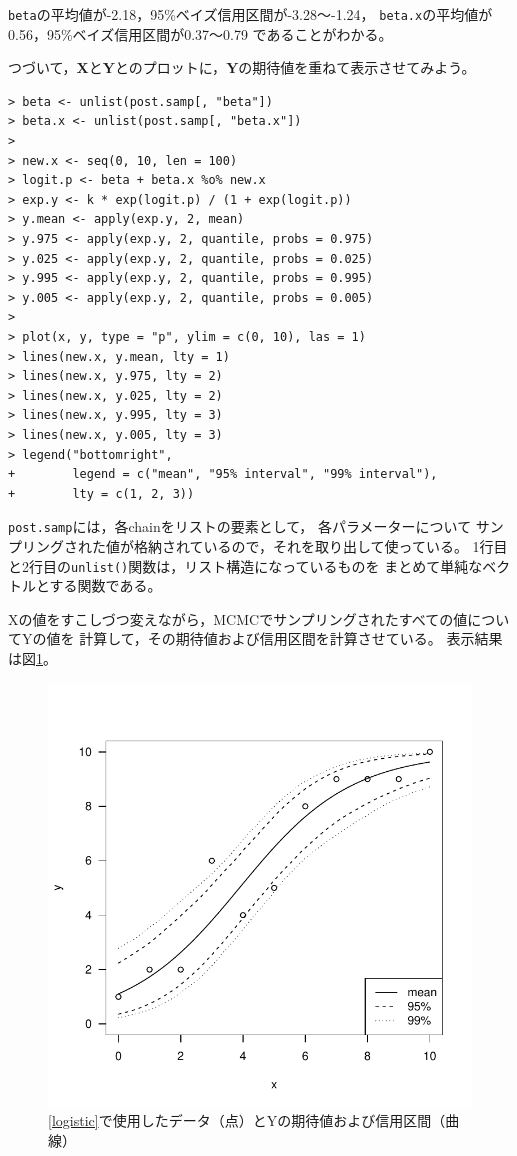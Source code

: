 \documentclass[11pt,uplatex]{jsarticle}
\begin{document}
\noindent
\texttt{beta}の平均値が-2.18，95\%ベイズ信用区間が-3.28〜-1.24，
\texttt{beta.x}の平均値が0.56，95\%ベイズ信用区間が0.37〜0.79
であることがわかる。


つづいて，$\bm{X}$と$\bm{Y}$とのプロットに，$\bm{Y}$の期待値を重ねて表示させてみよう。
\begin{lstlisting}
> beta <- unlist(post.samp[, "beta"])
> beta.x <- unlist(post.samp[, "beta.x"])
> 
> new.x <- seq(0, 10, len = 100)
> logit.p <- beta + beta.x %o% new.x
> exp.y <- k * exp(logit.p) / (1 + exp(logit.p))
> y.mean <- apply(exp.y, 2, mean)
> y.975 <- apply(exp.y, 2, quantile, probs = 0.975)
> y.025 <- apply(exp.y, 2, quantile, probs = 0.025)
> y.995 <- apply(exp.y, 2, quantile, probs = 0.995)
> y.005 <- apply(exp.y, 2, quantile, probs = 0.005)
> 
> plot(x, y, type = "p", ylim = c(0, 10), las = 1)
> lines(new.x, y.mean, lty = 1)
> lines(new.x, y.975, lty = 2)
> lines(new.x, y.025, lty = 2)
> lines(new.x, y.995, lty = 3)
> lines(new.x, y.005, lty = 3)
> legend("bottomright",
+        legend = c("mean", "95% interval", "99% interval"),
+        lty = c(1, 2, 3))
\end{lstlisting}
\noindent
\texttt{post.samp}には，各chainをリストの要素として，
各パラメーターについて
サンプリングされた値が格納されているので，それを取り出して使っている。
1行目と2行目の\texttt{unlist()}関数は，リスト構造になっているものを
まとめて単純なベクトルとする関数である。

Xの値をすこしづつ変えながら，MCMCでサンプリングされたすべての値についてYの値を
計算して，その期待値および信用区間を計算させている。
表示結果は図\ref{example2exp_plot}。
\begin{figure}[htbp]
  \begin{center}
    \includegraphics[bb=0 0 360 360, clip, width=240 bp]{example2exp.pdf}
  \end{center}
  \caption{\ref{logistic}で使用したデータ（点）とYの期待値および信用区間（曲線）}
  \label{example2exp_plot}
\end{figure}
\end{document}
